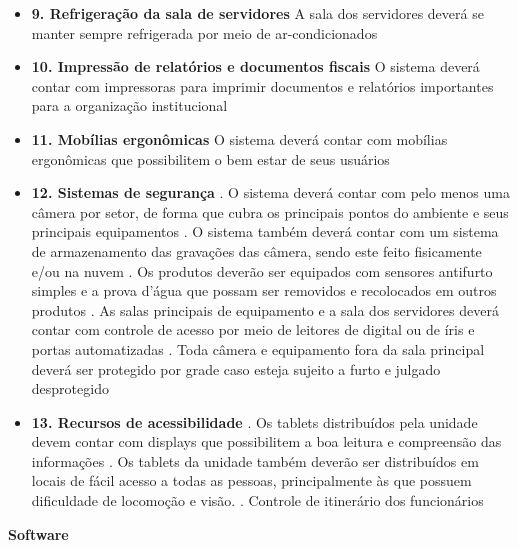 \begin{itemize}[label={}]
	\item \textbf{9. Refrigeração da sala de servidores}
		 A sala dos servidores deverá se manter sempre refrigerada por meio de ar-condicionados
	\item \textbf{10. Impressão de relatórios e documentos fiscais}
		 O sistema deverá contar com impressoras para imprimir documentos e relatórios importantes para a organização institucional
	\item \textbf{11. Mobílias ergonômicas}
		 O sistema deverá contar com mobílias ergonômicas que possibilitem o bem estar de seus usuários
	\item \textbf{12. Sistemas de segurança}
		. O sistema deverá contar com pelo menos uma câmera por setor, de forma que cubra os principais pontos do ambiente e seus principais equipamentos
		. O sistema também deverá contar com um sistema de armazenamento das gravações das câmera, sendo este feito fisicamente e/ou na nuvem 
		. Os produtos deverão ser equipados com sensores antifurto simples e a prova d'água que possam ser removidos e recolocados em outros produtos
		. As salas principais de equipamento e a sala dos servidores deverá contar com controle de acesso por meio de leitores de digital ou de íris e portas automatizadas
		. Toda câmera e equipamento fora da sala principal deverá ser protegido por grade caso esteja sujeito a furto e julgado desprotegido 
	\item \textbf{13. Recursos de acessibilidade}
		. Os tablets distribuídos pela unidade devem contar com displays que possibilitem a boa leitura e compreensão das informações
		. Os tablets da unidade também deverão ser distribuídos em locais de fácil acesso a todas as pessoas, principalmente às que possuem dificuldade de locomoção e visão. 
		. Controle de itinerário dos funcionários 
\end{itemize}
\textbf{Software}
